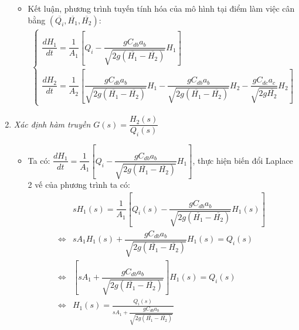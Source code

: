 \begin{enumerate}[\it a.]
\begin{itemize}
                \item Kết luận, phương trình tuyến tính hóa của mô hình tại điểm làm việc cân bằng $\left({\overline{Q_i}, \overline{H_1}, \overline{H_2}}\right)$:
                    \begin{align}
                        \left\{
                        \begin{array}{l}
                            \dfrac{dH_1}{dt} = \dfrac{1}{A_1} \left[{Q_i - \dfrac{gC_{db}a_b}{\sqrt{2g(\overline{H_1} - \overline{H_2})}} H_1}\right]\\ [.5cm]
                            \dfrac{dH_2}{dt} = \dfrac{1}{A_2} \left[{\dfrac{g C_{db}a_b}{\sqrt{2g(\overline{H_1} - \overline{H_2})}} H_1 - \dfrac{g C_{db}a_b}{\sqrt{2g(\overline{H_1} - \overline{H_2})}} H_2 - \dfrac{g C_{dc}a_c}{\sqrt{2g\overline{H_2}}} H_2}\right]
                        \end{array}
                        \right.
                    \end{align}
            \end{itemize}

        \item \textit{Xác định hàm truyền $G(s) = \dfrac{H_2(s)}{Q_i(s)}$}
            \begin{itemize}
                \item Ta có: $\dfrac{dH_1}{dt} = \dfrac{1}{A_1} \left[{Q_i - \dfrac{gC_{db}a_b}{\sqrt{2g(\overline{H_1} - \overline{H_2})}} H_1}\right]$, thực hiện biến đổi Laplace 2 vế của phương trình ta có:
                    \begin{align}
                        & s H_1(s) = \dfrac{1}{A_1} \left[{Q_i(s) - \dfrac{gC_{db}a_b}{\sqrt{2g(\overline{H_1} - \overline{H_2})}} H_1(s)}\right]\\
                        \Longleftrightarrow & s A_1 H_1(s) + \dfrac{gC_{db}a_b}{\sqrt{2g(\overline{H_1} - \overline{H_2})}} H_1(s) = Q_i(s)\\
                        \Longleftrightarrow & \left[{s A_1 + \dfrac{gC_{db}a_b}{\sqrt{2g(\overline{H_1} - \overline{H_2})}}}\right] H_1(s) = Q_i(s) \\
                        \Longleftrightarrow & H_1(s) = \frac{Q_i(s)}{s A_1 + \dfrac{gC_{db}a_b}{\sqrt{2g(\overline{H_1} - \overline{H_2})}}}
                    \end{align}


\end{itemize}
\end{enumerate}
